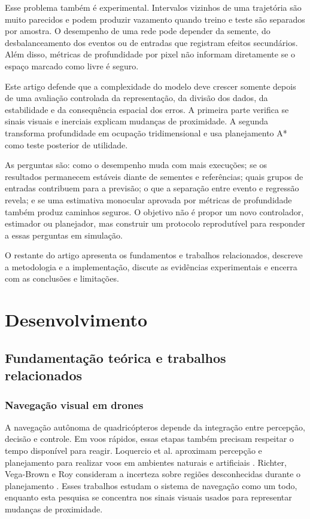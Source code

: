 \documentclass[article,a4paper,12pt,brazil,sumario=tradicional]{abntex2}
\begin{document}
Esse problema também é experimental. Intervalos vizinhos de uma trajetória são muito parecidos e podem produzir vazamento quando treino e teste são separados por amostra. O desempenho de uma rede pode depender da semente, do desbalanceamento dos eventos ou de entradas que registram efeitos secundários. Além disso, métricas de profundidade por pixel não informam diretamente se o espaço marcado como livre é seguro.

Este artigo defende que a complexidade do modelo deve crescer somente depois de uma avaliação controlada da representação, da divisão dos dados, da estabilidade e da consequência espacial dos erros. A primeira parte verifica se sinais visuais e inerciais explicam mudanças de proximidade. A segunda transforma profundidade em ocupação tridimensional e usa planejamento A* como teste posterior de utilidade.

As perguntas são: como o desempenho muda com mais execuções; se os resultados permanecem estáveis diante de sementes e referências; quais grupos de entradas contribuem para a previsão; o que a separação entre evento e regressão revela; e se uma estimativa monocular aprovada por métricas de profundidade também produz caminhos seguros. O objetivo não é propor um novo controlador, estimador ou planejador, mas construir um protocolo reprodutível para responder a essas perguntas em simulação.

O restante do artigo apresenta os fundamentos e trabalhos relacionados, descreve a metodologia e a implementação, discute as evidências experimentais e encerra com as conclusões e limitações.

\section{Desenvolvimento}

\subsection{Fundamentação teórica e trabalhos relacionados}

\subsubsection{Navegação visual em drones}

A navegação autônoma de quadricópteros depende da integração entre percepção, decisão e controle. Em voos rápidos, essas etapas também precisam respeitar o tempo disponível para reagir. Loquercio et al. aproximam percepção e planejamento para realizar voos em ambientes naturais e artificiais \cite{Loquercio2021}. Richter, Vega-Brown e Roy consideram a incerteza sobre regiões desconhecidas durante o planejamento \cite{BayesianLearning2015}. Esses trabalhos estudam o sistema de navegação como um todo, enquanto esta pesquisa se concentra nos sinais visuais usados para representar mudanças de proximidade.
\end{document}
